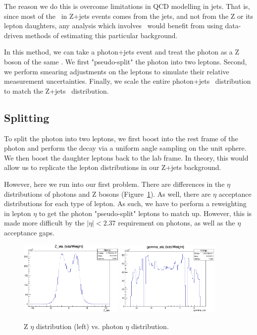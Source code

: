 The reason we do this is overcome limitations in QCD modelling in jets. That is, since most of the \MET\ in Z+jets events comes from the jets, and not from the Z or its lepton daughters, any analysis which involves \MET\ would benefit from using data-driven methods of estimating this particular background.

In this method, we can take a photon+jets event and treat the photon as a Z boson of the same \pt. We first "pseudo-split" the photon into two leptons. Second, we perform smearing adjustments on the leptons to simulate their relative measurement uncertainties. Finally, we scale the entire photon+jets \pt\ distribution to match the Z+jets \pt\ distribution.

\subsection*{Splitting}

To split the photon into two leptons, we first boost into the rest frame of the photon and perform the decay via a uniform angle sampling on the unit sphere. We then boost the daughter leptons back to the lab frame. In theory, this would allow us to replicate the lepton distributions in our Z+jets background.

However, here we run into our first problem. There are differences in the $\eta$ distributions of photons and Z bosons (Figure~\ref{fig:Z_photon_eta}). As well, there are $\eta$ acceptance distributions for each type of lepton. As such, we have to perform a reweighting in lepton $\eta$ to get the photon "pseudo-split" leptons to match up. However, this is made more difficult by the $|\eta|<2.37$ requirement on photons, as well as the $\eta$ acceptance gaps.

\begin{figure}[htbp]
    \centering
    \includegraphics[width=0.45\textwidth]{Images/SUSY/Z_eta.png}
    \includegraphics[width=0.45\textwidth]{Images/SUSY/photon_eta.png}
    \caption{Z $\eta$ distribution (left) vs. photon $\eta$ distribution.}
    \label{fig:Z_photon_eta}
\end{figure}

